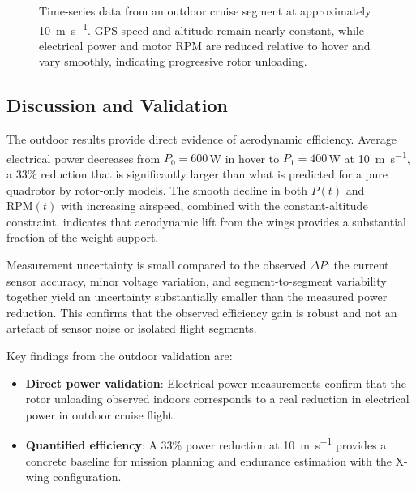 \begin{figure}[p]
  \vspace{0.3cm}
  
  
  \caption{Time-series data from an outdoor cruise segment at approximately \SI{10}{\meter\per\second}. GPS speed and altitude remain nearly constant, while electrical power and motor RPM are reduced relative to hover and vary smoothly, indicating progressive rotor unloading.}
  \label{fig:outdoor_timeseries}
\end{figure}

\subsection{Discussion and Validation}\label{sec:outdoor-discussion}

The outdoor results provide direct evidence of aerodynamic efficiency.
Average electrical power decreases from $P_0 = 600$\,W in hover to $P_1 = 400$\,W at \SI{10}{\meter\per\second}, a 33\% reduction that is significantly larger than what is predicted for a pure quadrotor by rotor-only models.
The smooth decline in both $P(t)$ and $\text{RPM}(t)$ with increasing airspeed, combined with the constant-altitude constraint, indicates that aerodynamic lift from the wings provides a substantial fraction of the weight support.

Measurement uncertainty is small compared to the observed $\Delta P$: the current sensor accuracy, minor voltage variation, and segment-to-segment variability together yield an uncertainty substantially smaller than the measured power reduction.
This confirms that the observed efficiency gain is robust and not an artefact of sensor noise or isolated flight segments.

Key findings from the outdoor validation are:
\begin{itemize}
  \item \textbf{Direct power validation}: Electrical power measurements confirm that the rotor unloading observed indoors corresponds to a real reduction in electrical power in outdoor cruise flight.
  \item \textbf{Quantified efficiency}: A 33\% power reduction at \SI{10}{\meter\per\second} provides a concrete baseline for mission planning and endurance estimation with the X-wing configuration.
\end{itemize}


